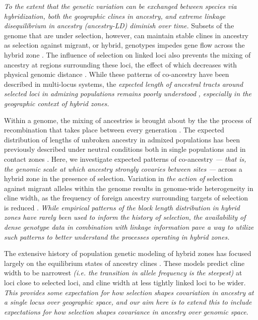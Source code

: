 \documentclass[12pt]{article}
\newcommand{\alisa}[1]{{\em \color{red} #1}}
\newcommand{\yb}[1]{{\em \color{magenta} #1}}
\begin{document}
\yb{To the extent that the genetic variation can be exchanged between species via hybridization, both the geographic clines in ancestry, and extreme linkage disequilibrium in ancestry (ancestry-LD) diminish over time.} Subsets of the genome that are under selection, however, can maintain stable clines in ancestry as selection against migrant, or hybrid, genotypes impedes gene flow across the hybrid zone \citep{Barton1979a}. The influence of selection on linked loci also prevents the mixing of ancestry at regions surrounding these loci, the effect of which decreases with physical genomic distance \citep{Barton1986,Barton1983}. While these patterns of co-ancestry have been described in multi-locus systems, the  \yb{expected length of ancestral tracts around selected loci in admixing populations remains poorly understood}\alisa{, especially in the geographic context of hybrid zones.}


Within a genome, the mixing of ancestries is brought about by the the process of recombination that takes place between every generation \citep{Fisher1954, Chapman2002, Baird2003}.   
The expected distribution of lengths of unbroken ancestry in admixed populations has been previously described under neutral conditions both in single populations and in contact zones \cite[e.g.][]{Gravel2012,Sedghifar2015}.  Here, we investigate expected patterns of co-ancestry \yb{ --- that is, the genomic scale at which ancestry strongly covaries between sites --- } across a hybrid zone in the presence of selection. Variation in \yb{ the action of } selection against migrant alleles within the genome results in genome-wide heterogeneity in cline width, as the frequency of foreign ancestry surrounding targets of selection is reduced \cite{Barton1979}. 
\yb{While empirical patterns of the block length distribution in hybrid zones have rarely been used to inform the history of selection,}  \alisa{the availability of dense genotype data in combination with linkage information pave a way to utilize such patterns to better understand the processes operating in hybrid zones. } %


The extensive history of population genetic modeling of hybrid zones has focused largely on the equilibrium states of ancestry clines \cite{Barton1979a,Barton1986}.  
These models predict cline width to be narrowest \yb{(i.e. the transition in allele frequency is the steepest)} at loci close to selected loci, and cline width at less tightly linked loci to be wider. %
\yb{This provides some expectation for how selection shapes covariation in ancestry at a single locus over \emph{geographic space}, and our aim here  is to extend this to include expectations for how selection shapes covariance in ancestry over \emph{genomic space}}.
\end{document}
